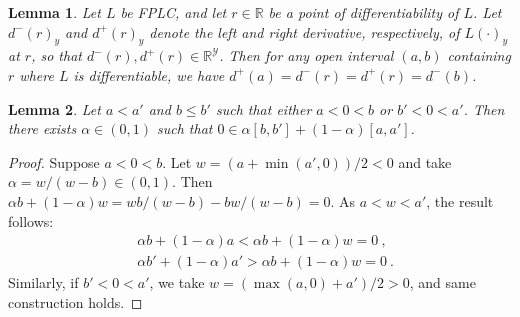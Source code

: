 \documentclass[11pt]{article}
\newcommand{\reals}{\mathbb{R}}
\newcommand{\Y}{\mathcal{Y}}
\newtheorem{lemma}{Lemma}
\begin{document}
\begin{lemma}\label{lem:fplc-directional-deriv}
  Let $L$ be FPLC, and let $r\in\reals$ be a point of differentiability of $L$.
  Let $d^-(r)_y$ and $d^+(r)_y$ denote the left and right derivative, respectively, of $L(\cdot)_y$ at $r$, so that $d^-(r),d^+(r)\in\reals^\Y$.
  Then for any open interval $(a,b)$ containing $r$ where $L$ is differentiable, we have
$d^+(a) = d^-(r) = d^+(r) = d^-(b)$.
\end{lemma}

\begin{lemma}\label{lem:simple-intervals}
  Let $a<a'$ and $b\leq b'$ such that either $a< 0 < b$ or $b' < 0 < a'$.
  Then there exists $\alpha \in (0,1)$ such that $0 \in \alpha [b,b'] + (1-\alpha) [a,a']$.
\end{lemma}
\begin{proof}
  Suppose $a < 0 < b$.
  Let $w = (a + \min(a',0))/2 < 0$ and take $\alpha = w/(w-b) \in (0,1)$.
  Then $\alpha b + (1-\alpha) w = wb/(w-b) - bw/(w-b) = 0$.
  As $a < w < a'$, the result follows:
  \begin{align*}
    & \alpha b + (1-\alpha) a < \alpha b + (1-\alpha) w = 0~,
    \\
    & \alpha b' + (1-\alpha) a' > \alpha b + (1-\alpha) w = 0~.
  \end{align*}
  Similarly, if $b' < 0 < a'$, we take $w = (\max(a,0)+a')/2 > 0$, and same construction holds.
\end{proof}
\end{document}
